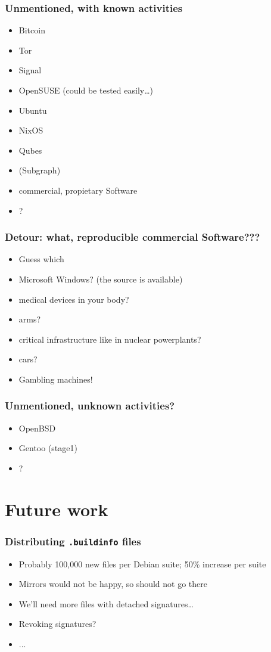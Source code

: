 \documentclass[14pt]{beamer}
\newif\ifplacelogo
\begin{document}
\begin{frame}
 \frametitle{Unmentioned, with known activities}
 \begin{itemize}
\item Bitcoin
\item Tor
\item Signal
\item OpenSUSE (could be tested easily…)
\item Ubuntu
\item NixOS
\item Qubes
\item (Subgraph)
\item    commercial, propietary Software
\item ?
 \end{itemize}
\end{frame}

\begin{frame}
 \frametitle{Detour: what, reproducible commercial Software???}
 \begin{itemize}
\item Guess which
\item <2-3>   Microsoft Windows? (the source is available)
\item <2-3>   medical devices in your body?
\item <2-3>   arms?
\item <2-3>   critical infrastructure like in nuclear powerplants?
\item <2-3>   cars?
\item <3> Gambling machines!
 \end{itemize}
\end{frame}

\begin{frame}
 \frametitle{Unmentioned, unknown activities?}
 \begin{itemize}
\item  OpenBSD
\item  Gentoo (stage1)
 \item ?
\end{itemize}
\end{frame}


\placelogotrue

\section{Future work}




\begin{frame}
 \frametitle{Distributing \texttt{.buildinfo} files}
 \begin{itemize}
  \item Probably 100,000 new files per Debian suite; 50\% increase per suite
  \item Mirrors would not be happy, so should not go there
  \item<2> We'll need more files with detached signatures…
  \item<2>{Revoking signatures?}
  \item<2>{...}
 \end{itemize}
\end{frame}
\end{document}
